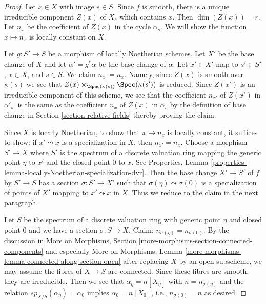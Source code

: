 \begin{proof}
Let $x \in X$ with image $s \in S$. Since $f$ is smooth, there is a
unique irreducible component $Z(x)$ of $X_s$ which contains $x$.
Then $\dim(Z(x)) = r$.
Let $n_x$ be the coefficient of $Z(x)$ in the cycle $\alpha_s$.
We will show the function $x \mapsto n_x$ is locally constant on $X$.

\medskip\noindent
Let $g : S' \to S$ be a morphism of locally Noetherian schemes.
Let $X'$ be the base change of $X$ and let $\alpha' = g^*\alpha$
be the base change of $\alpha$. Let $x' \in X'$ map to $s' \in S'$,
$x \in X$, and $s \in S$. We claim $n_{x'} = n_x$. Namely, since $Z(x)$
is smooth over $\kappa(s)$ we see that
$Z(x) \times_{\Spec(\kappa(s))} \Spec(\kappa(s'))$
is reduced. Since $Z(x')$ is an irreducible component
of this scheme, we see that the coefficient $n_{x'}$ of $Z(x')$
in $\alpha'_{s'}$ is the same as the coefficient $n_x$ of $Z(x)$
in $\alpha_s$ by the definition of base change in
Section \ref{section-relative-fields}
thereby proving the claim.

\medskip\noindent
Since $X$ is locally Noetherian, to show that $x \mapsto n_x$
is locally constant, it suffices to show: if $x' \leadsto x$
is a specialization in $X$, then $n_{x'} = n_x$.
Choose a morphism $S' \to X$ where $S'$ is the spectrum of a discrete
valuation ring mapping the generic point $\eta$ to $x'$ and the closed point
$0$ to $x$. See Properties, Lemma
\ref{properties-lemma-locally-Noetherian-specialization-dvr}.
Then the base change $X' \to S'$ of $f$ by $S' \to S$
has a section $\sigma : S' \to X'$ such that $\sigma(\eta) \leadsto \sigma(0)$
is a specialization of points of $X'$ mapping to $x' \leadsto x$ in $X$.
Thus we reduce to the claim in the next paragraph.

\medskip\noindent
Let $S$ be the spectrum of a discrete valuation ring with
generic point $\eta$ and closed point $0$ and we have a section
$\sigma : S  \to X$. Claim: $n_{\sigma(\eta)} = n_{\sigma(0)}$.
By the discussion in More on Morphisms, Section
\ref{more-morphisms-section-connected-components} and especially
More on Morphisms, Lemma \ref{more-morphisms-lemma-connected-along-section-open}
after replacing $X$ by an open subscheme, we may assume the
fibres of $X \to S$ are connected. Since these fibres
are smooth, they are irreducible. Then we see that $\alpha_\eta = n[X_\eta]$
with $n = n_{\sigma(\eta)}$ and the relation $sp_{X/S}(\alpha_\eta) = \alpha_0$
implies $\alpha_0 = n[X_0]$, i.e., $n_{\sigma(0)} = n$ as desired.
\end{proof}

